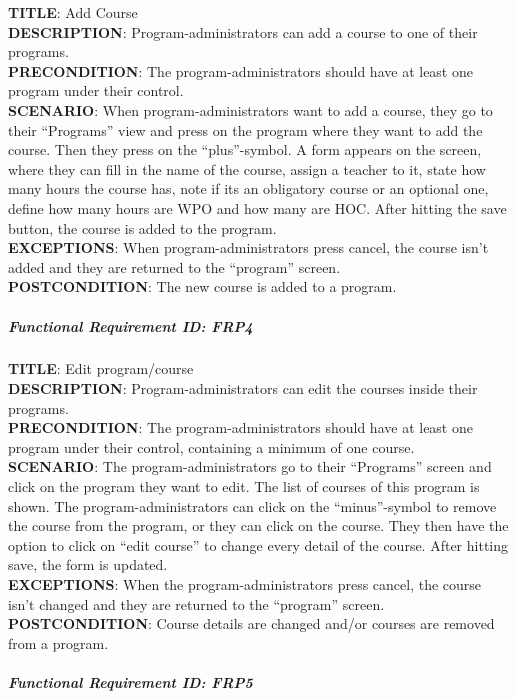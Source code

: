 \documentclass[12pt]{article}
\begin{document}
\textbf{TITLE}: Add Course\\\textbf{DESCRIPTION}: Program-administrators
can add a course to one of their programs.\\\textbf{PRECONDITION}: The
program-administrators should have at least one program under their
control.\\\textbf{SCENARIO}: When program-administrators want to add a
course, they go to their ``Programs'' view and press on the program
where they want to add the course. Then they press on the
``plus''-symbol. A form appears on the screen, where they can fill in
the name of the course, assign a teacher to it, state how many hours the
course has, note if its an obligatory course or an optional one, define
how many hours are WPO and how many are HOC. After hitting the save
button, the course is added to the program.\\\textbf{EXCEPTIONS}: When
program-administrators press cancel, the course isn't added and they are
returned to the ``program'' screen.\\\textbf{POSTCONDITION}: The new
course is added to a program.

\subparagraph{Functional Requirement \textbf{ID}:
FRP4}\label{functional-requirement-id-frp4}

\textbf{TITLE}: Edit program/course\\\textbf{DESCRIPTION}:
Program-administrators can edit the courses inside their
programs.\\\textbf{PRECONDITION}: The program-administrators should have
at least one program under their control, containing a minimum of one
course.\\\textbf{SCENARIO}: The program-administrators go to their
``Programs'' screen and click on the program they want to edit. The list
of courses of this program is shown. The program-administrators can
click on the ``minus''-symbol to remove the course from the program, or
they can click on the course. They then have the option to click on
``edit course'' to change every detail of the course. After hitting
save, the form is updated.\\\textbf{EXCEPTIONS}: When the
program-administrators press cancel, the course isn't changed and they
are returned to the ``program'' screen. \textbf{POSTCONDITION}: Course
details are changed and/or courses are removed from a program.

\subparagraph{Functional Requirement \textbf{ID}:
FRP5}\label{functional-requirement-id-frp5}
\end{document}
